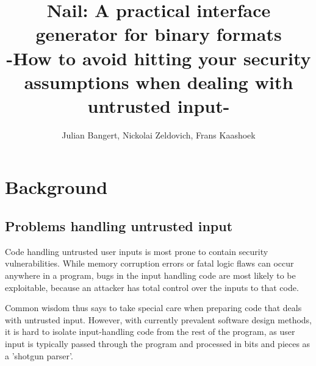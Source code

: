 \documentclass[10pt]{article}
\begin{document}
\author{Julian Bangert, Nickolai Zeldovich, Frans Kaashoek} 
\date{}
\title{Nail: A practical interface generator for binary formats \\ \small-How to avoid hitting
  your security assumptions when dealing with untrusted input-}
\maketitle

\section{Background}




\subsection{Problems handling untrusted input}
Code handling untrusted user inputs is most prone to contain security vulnerabilities. While memory
corruption errors or fatal logic flaws can occur anywhere in a program, bugs in the input handling
code are most likely to be exploitable, because an attacker has total control over the inputs to
that code. 

Common wisdom thus says to take special care when preparing code that deals with untrusted input.
However, with currently prevalent software design methods, it is hard to isolate input-handling code
from the rest of the program, as user input is typically passed through the program and processed in
bits and pieces as a 'shotgun parser'\cite{shotgun-parser}.  
\end{document}

